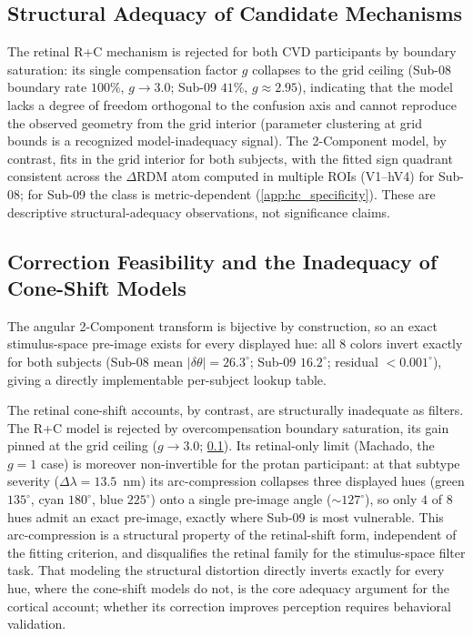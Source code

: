 \documentclass{article}
\begin{document}
\subsection{Structural Adequacy of Candidate Mechanisms}
\label{app:adequacy}

The retinal R+C mechanism is rejected for both CVD participants by boundary saturation: its single compensation factor $g$ collapses to the grid ceiling (Sub-08 boundary rate $100\%$, $g{\to}3.0$; Sub-09 $41\%$, $g{\approx}2.95$), indicating that the model lacks a degree of freedom orthogonal to the confusion axis and cannot reproduce the observed geometry from the grid interior (parameter clustering at grid bounds is a recognized model-inadequacy signal).
The 2-Component model, by contrast, fits in the grid interior for both subjects, with the fitted sign quadrant consistent across the $\Delta$RDM atom computed in multiple ROIs (V1--hV4) for Sub-08; for Sub-09 the class is metric-dependent (\cref{app:hc_specificity}).
These are descriptive structural-adequacy observations, not significance claims.

\subsection{Correction Feasibility and the Inadequacy of Cone-Shift Models}
\label{app:feasibility}

The angular 2-Component transform is bijective by construction, so an exact stimulus-space pre-image exists for every displayed hue: all 8 colors invert exactly for both subjects (Sub-08 mean $|\delta\theta| = 26.3^\circ$; Sub-09 $16.2^\circ$; residual $<0.001^\circ$), giving a directly implementable per-subject lookup table.

The retinal cone-shift accounts, by contrast, are structurally inadequate as filters.
The R+C model is rejected by overcompensation boundary saturation, its gain pinned at the grid ceiling ($g{\to}3.0$; \cref{app:adequacy}).
Its retinal-only limit (Machado, the $g{=}1$ case) is moreover non-invertible for the protan participant: at that subtype severity ($\Delta\lambda = 13.5$~nm) its arc-compression collapses three displayed hues (green $135^\circ$, cyan $180^\circ$, blue $225^\circ$) onto a single pre-image angle (${\sim}127^\circ$), so only $4$ of $8$ hues admit an exact pre-image, exactly where Sub-09 is most vulnerable.
This arc-compression is a structural property of the retinal-shift form, independent of the fitting criterion, and disqualifies the retinal family for the stimulus-space filter task.
That modeling the structural distortion directly inverts exactly for every hue, where the cone-shift models do not, is the core adequacy argument for the cortical account; whether its correction improves perception requires behavioral validation.
\end{document}
